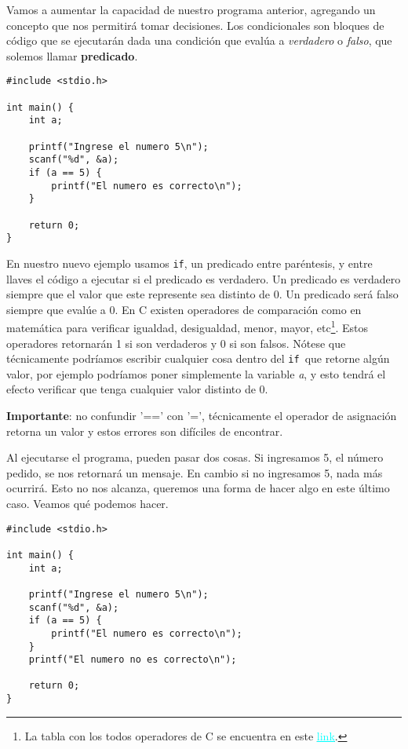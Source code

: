 \documentclass[10pt]{article}
\newcommand{\cif}[0]{\lstinline{if}}
\begin{document}
Vamos a aumentar la capacidad de nuestro programa anterior, agregando un concepto que nos permitirá tomar decisiones. Los condicionales son bloques de código que se ejecutarán dada una condición que evalúa a \textit{verdadero} o \textit{falso}, que solemos llamar \textbf{predicado}.

\begin{lstlisting}
#include <stdio.h>

int main() {
	int a;

	printf("Ingrese el numero 5\n");
	scanf("%d", &a);
	if (a == 5) {
		printf("El numero es correcto\n");
	}

	return 0;
}
\end{lstlisting}

En nuestro nuevo ejemplo usamos \cif, un predicado entre paréntesis, y entre llaves el código a ejecutar si el predicado es verdadero. Un predicado es verdadero siempre que el valor que este represente sea distinto de 0. Un predicado será falso siempre que evalúe a 0. En C existen operadores de comparación como en matemática para verificar igualdad, desigualdad, menor, mayor, etc\footnote{La tabla con los todos operadores de C se encuentra en este \href{http://lsi.vc.ehu.es/pablogn/docencia/FdI/FdIc/labs/a1/htm/oper.html}{\textcolor{cyan}{\underline{link}}}.}. Estos operadores retornarán 1 si son verdaderos y 0 si son falsos. Nótese que técnicamente podríamos escribir cualquier cosa dentro del \cif\ que retorne algún valor, por ejemplo podríamos poner simplemente la variable \textit{a}, y esto tendrá el efecto verificar que tenga cualquier valor distinto de 0.

\textbf{Importante}: no confundir '==' con '=', técnicamente el operador de asignación retorna un valor y estos errores son difíciles de encontrar.

\bigskip

Al ejecutarse el programa, pueden pasar dos cosas. Si ingresamos 5, el número pedido, se nos retornará un mensaje. En cambio si no ingresamos 5, nada más ocurrirá. Esto no nos alcanza, queremos una forma de hacer algo en este último caso. Veamos qué podemos hacer.

\begin{lstlisting}
#include <stdio.h>

int main() {
	int a;

	printf("Ingrese el numero 5\n");
	scanf("%d", &a);
	if (a == 5) {
		printf("El numero es correcto\n");
	}
	printf("El numero no es correcto\n");

	return 0;
}
\end{lstlisting}
\end{document}
